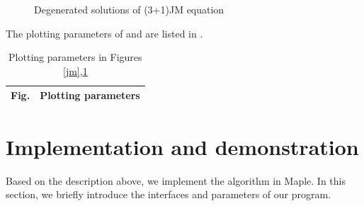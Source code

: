 \begin{figure}
\centering
{}
\caption{Degenerated solutions of (3+1)JM equation} \label{jmd}
\end{figure}

The plotting parameters of  and  are listed in .

\begin{table}
\centering 
\caption{Plotting parameters in Figures \ref{jm},\ref{jmd} \label{jm-plist}}
\small
\renewcommand{\arraystretch}{1.1}
\begin{tabular}{cp{}}
\hline 
Fig. & \multicolumn{1}{c}{Plotting parameters} \\ 
\hline 

\hline
\end{tabular}
\end{table}

\section{Implementation and demonstration}\label{Implementation-01}
Based on the description above, we implement the algorithm in Maple. In this section, we briefly introduce the interfaces and parameters of our program.

